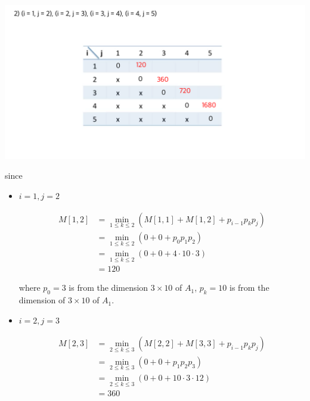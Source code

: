 \documentclass[12pt]{article}
\begin{document}
\begin{enumerate}[1.]
\begin{itemize}
\begin{itemize}
\begin{enumerate}[1.]
\begin{enumerate}[1)]
                    \begin{center}
                    \includegraphics[width=\linewidth]{images/worksheet_3_solution_3.png}
                    \end{center}

                    since

                    \begin{itemize}
                        \item $i = 1, j = 2$

                        \begin{align}
                            M[1,2] &= \min_{1 \leq k \leq 2} (M[1,1] + M[1,2] + p_{i-1}p_kp_j)\\
                            &= \min_{1 \leq k \leq 2} (0 + 0 + p_0p_1p_2)\\
                            &= \min_{1 \leq k \leq 2} (0 + 0 + 4 \cdot 10 \cdot 3)\\
                            &= 120
                        \end{align}

                        where $p_0 = 3$ is from the dimension $3 \times 10$ of $A_1$, $p_k = 10$
                        is from the dimension of $3 \times 10$ of $A_1$.

                        \item $i = 2, j = 3$

                        \begin{align}
                            M[2,3] &= \min_{2 \leq k \leq 3} (M[2,2] + M[3,3] + p_{i-1}p_kp_j)\\
                            &= \min_{2 \leq k \leq 3} (0 + 0 + p_1p_2p_3)\\
                            &= \min_{2 \leq k \leq 3} (0 + 0 + 10 \cdot 3 \cdot 12)\\
                            &= 360
                        \end{align}


\end{itemize}
\end{enumerate}
\end{enumerate}
\end{itemize}
\end{itemize}
\end{enumerate}
\end{document}
